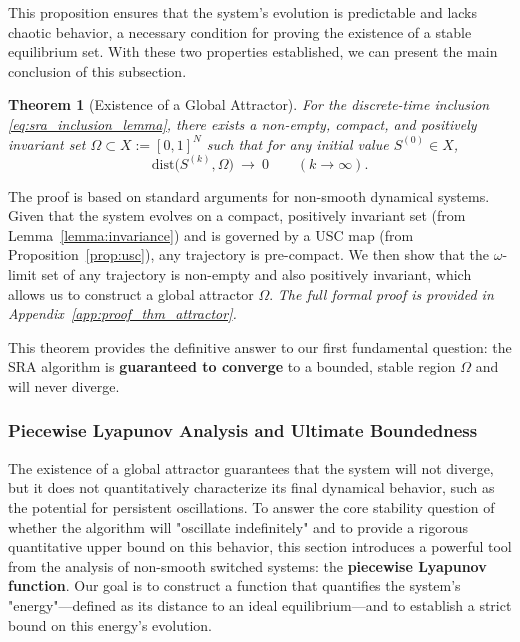 \documentclass[journal]{IEEEtran}
\newtheorem{theorem}{Theorem}
\begin{document}
This proposition ensures that the system's evolution is predictable and lacks chaotic behavior, a necessary condition for proving the existence of a stable equilibrium set. With these two properties established, we can present the main conclusion of this subsection.

\begin{theorem}[Existence of a Global Attractor]
\label{thm:attractor}
For the discrete-time inclusion \eqref{eq:sra_inclusion_lemma}, there exists a non-empty, compact, and positively invariant set $\Omega\subset X:=[0,1]^N$ such that for any initial value $S^{(0)}\in X$,
\begin{equation}\label{eq:attractor_convergence}
\mathrm{dist}\big(S^{(k)},\Omega\big)\ \to\ 0\qquad (k\to\infty).
\end{equation}
\end{theorem}

\begin{IEEEproof}
The proof is based on standard arguments for non-smooth dynamical systems. Given that the system evolves on a compact, positively invariant set (from Lemma~\ref{lemma:invariance}) and is governed by a USC map (from Proposition~\ref{prop:usc}), any trajectory is pre-compact. We then show that the $\omega$-limit set of any trajectory is non-empty and also positively invariant, which allows us to construct a global attractor $\Omega$.
\textit{The full formal proof is provided in Appendix~\ref{app:proof_thm_attractor}.}
\end{IEEEproof}

This theorem provides the definitive answer to our first fundamental question: the SRA algorithm is \textbf{guaranteed to converge} to a bounded, stable region $\Omega$ and will never diverge.

\subsubsection{Piecewise Lyapunov Analysis and Ultimate Boundedness}
\label{subsec:lyapunov}

The existence of a global attractor guarantees that the system will not diverge, but it does not quantitatively characterize its final dynamical behavior, such as the potential for persistent oscillations. To answer the core stability question of whether the algorithm will "oscillate indefinitely" and to provide a rigorous quantitative upper bound on this behavior, this section introduces a powerful tool from the analysis of non-smooth switched systems: the \textbf{piecewise Lyapunov function}. Our goal is to construct a function that quantifies the system's "energy"—defined as its distance to an ideal equilibrium—and to establish a strict bound on this energy's evolution.
\end{document}
